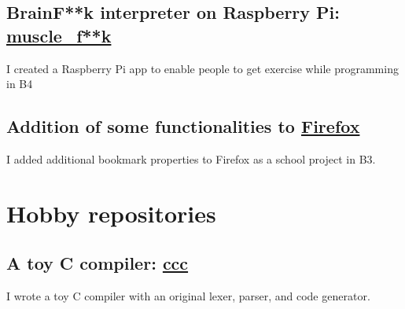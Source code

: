 \documentclass[12pt]{article}
\begin{document}
  \subsection*{BrainF**k interpreter on Raspberry Pi: \href{https://github.com/diohabara/muscle_fuck}{muscle\_f**k}}
    I created a Raspberry Pi app to enable people to get exercise while programming in B4
  \subsection*{Addition of some functionalities to \href{https://slides.com/diohabara/deck}{Firefox}}
    I added additional bookmark properties to Firefox as a school project in B3.

\section*{Hobby repositories}
  \subsection*{A toy C compiler: \href{https://github.com/diohabara/ccc}{ccc}}
    I wrote a toy C compiler with an original lexer, parser, and code generator.
\end{document}
